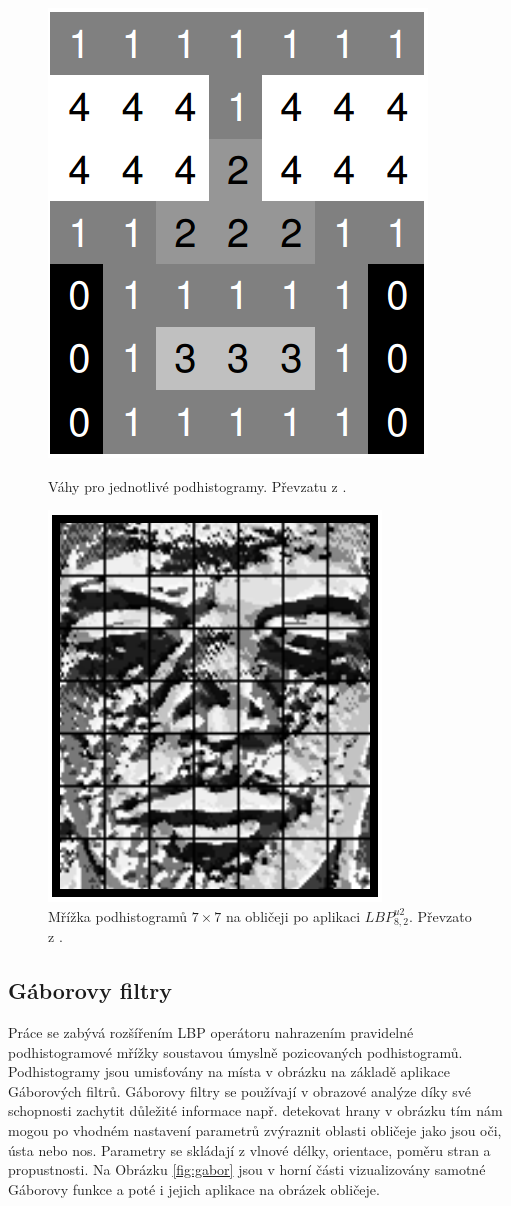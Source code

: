 \documentclass[czech,BP]{thesiskiv}
\begin{document}
\begin{figure}[h!]
\centering
\begin{minipage}{.4\textwidth}
  \centering
  \includegraphics[width=0.39\linewidth]{img/histogram_weights.png}
	\caption{Váhy pro jednotlivé podhistogramy. Převzatu z \cite{Lopez2010}.}
  \label{fig:weighted}
\end{minipage}%
\hspace{1.5cm}
\begin{minipage}{.4\textwidth}
  \centering
  \includegraphics[width=.4\linewidth]{img/subhistograms.png}
  \caption{Mřížka podhistogramů $7\times 7$ na obličeji po aplikaci $LBP_{8,2}^{u2}$. Převzato z \cite{Lopez2010}.}
\label{fig:7x7lbp82}
\end{minipage}
\end{figure}

\subsection{Gáborovy filtry}
Práce \citet{LencKral2016} se zabývá rozšířením LBP operátoru nahrazením pravidelné podhistogramové mřížky soustavou úmyslně pozicovaných podhistogramů. Podhistogramy jsou umisťovány na  místa v obrázku na základě aplikace Gáborových filtrů. Gáborovy filtry se používají v obrazové analýze díky své schopnosti zachytit důležité informace např. detekovat hrany v obrázku tím nám mogou po vhodném nastavení parametrů zvýraznit oblasti obličeje jako jsou oči, ústa nebo nos. Parametry se skládají z vlnové délky, orientace, poměru stran a propustnosti. Na Obrázku \ref{fig:gabor} jsou v horní části vizualizovány samotné Gáborovy funkce a poté i jejich aplikace na obrázek obličeje. 
\end{document}
